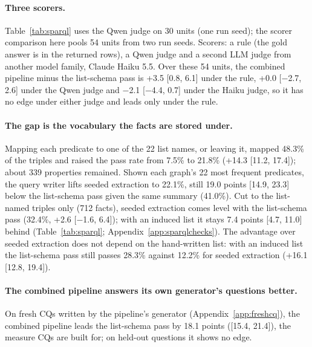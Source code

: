 \paragraph{Three scorers.}
Table~\ref{tab:sparql} uses the Qwen judge on 30 units (one run seed); the scorer comparison here pools 54 units from two run seeds. Scorers: a rule (the gold answer is in the returned rows), a Qwen judge and a second LLM judge from another model family, Claude Haiku 5.5. Over these 54 units, the combined pipeline minus the list-schema pass is +3.5 [0.8, 6.1] under the rule, +0.0 [$-$2.7, 2.6] under the Qwen judge and $-$2.1 [$-$4.4, 0.7] under the Haiku judge, so it has no edge under either judge and leads only under the rule.

\paragraph{The gap is the vocabulary the facts are stored under.}
Mapping each predicate to one of the 22 list names, or leaving it, mapped 48.3\% of the triples and raised the pass rate from 7.5\% to 21.8\% (+14.3 [11.2, 17.4]); about 339 properties remained. Shown each graph's 22 most frequent predicates, the query writer lifts seeded extraction to 22.1\%, still 19.0 points [14.9, 23.3] below the list-schema pass given the same summary (41.0\%). Cut to the list-named triples only (712 facts), seeded extraction comes level with the list-schema pass (32.4\%, +2.6 [$-$1.6, 6.4]); with an induced list it stays 7.4 points [4.7, 11.0] behind (Table~\ref{tab:sparql}; Appendix~\ref{app:sparqlchecks}). The advantage over seeded extraction does not depend on the hand-written list: with an induced list the list-schema pass still passes 28.3\% against 12.2\% for seeded extraction (+16.1 [12.8, 19.4]).

\paragraph{The combined pipeline answers its own generator's questions better.}
On fresh CQs written by the pipeline's generator (Appendix~\ref{app:freshcq}), the combined pipeline leads the list-schema pass by 18.1 points ([15.4, 21.4]), the measure CQs are built for; on held-out questions it shows no edge.
